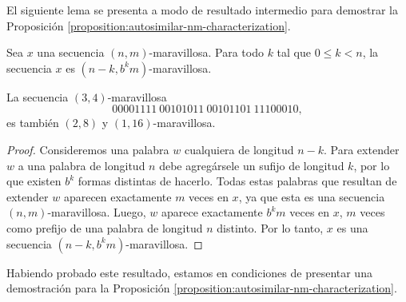 El siguiente lema se presenta a modo de resultado intermedio para
demostrar la Proposición \ref{proposition:autosimilar-nm-characterization}.

\begin{lemma} \label{lemma:marvellous-for-smaller-n}
	Sea $x$ una secuencia $(n,m)$-maravillosa.
	Para todo $k$ tal que $0 \leq k < n$, la secuencia $x$ es
	$(n - k, b^{k}m)$-maravillosa.
\end{lemma}

\begin{example}
	La secuencia $(3,4)$-maravillosa \[ 00001111\ 00101011\ 00101101\ 11100010, \]
	es también $(2,8)$ y $(1,16)$-maravillosa.
\end{example}

\begin{proof}
	Consideremos una palabra $w$ cualquiera de longitud $n - k$.
	Para extender $w$ a una palabra de longitud $n$ debe agregársele un sufijo de
	longitud $k$, por lo que existen $b^{k}$ formas distintas de hacerlo.
	Todas estas palabras que resultan de extender $w$ aparecen exactamente $m$
	veces en $x$, ya que esta es una secuencia $(n,m)$-maravillosa.
	Luego, $w$ aparece exactamente $b^{k}m$ veces en $x$, $m$ veces como prefijo de
	una palabra de longitud $n$ distinto.
	Por lo tanto, $x$ es una secuencia $(n - k, b^{k}m)$-maravillosa.
\end{proof}

Habiendo probado este resultado, estamos en condiciones de presentar una
demostración para la Proposición \ref{proposition:autosimilar-nm-characterization}.


